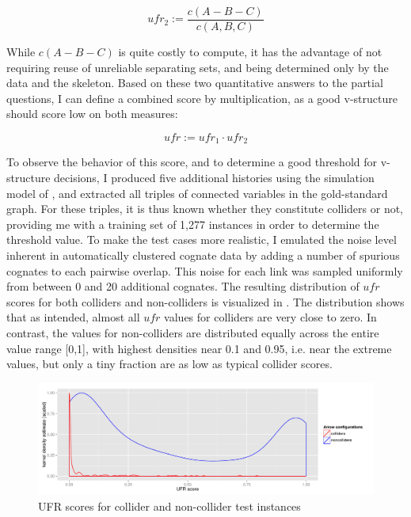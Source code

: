 \begin{equation}
 ufr_2 := \frac{c(A-B-C)}{c(A,B,C)}
\end{equation}

While $c(A-B-C)$ is quite costly to compute, it has the advantage of not requiring reuse of unreliable separating sets, and being determined only by the data and the skeleton. Based on these two quantitative answers to the partial questions, I can define a combined score by multiplication, as a good v-structure should score low on both measures:

\begin{equation}
 ufr := ufr_1 \cdot ufr_2
\end{equation}
 
To observe the behavior of this \textit{} score, and to determine a good threshold for v-structure decisions, I produced five additional histories using the simulation model of , and extracted all triples of connected variables in the gold-standard graph. For these triples, it is thus known whether they constitute colliders or not, providing me with a training set of 1,277 instances in order to determine the threshold value. To make the test cases more realistic, I emulated the noise level inherent in automatically clustered cognate data by adding a number of spurious cognates to each pairwise overlap. This noise for each link was sampled uniformly from between 0 and 20 additional cognates. The resulting distribution of $ufr$ scores for both colliders and non-colliders is visualized in . The distribution shows that as intended, almost all $ufr$ values for colliders are very close to zero. In contrast, the values for non-colliders are distributed 
equally across the entire value range [0,1], with highest densities near 0.1 and 0.95, i.e. near the extreme values, but only a tiny fraction are as low as typical collider scores.

\begin{figure}
 \includegraphics[width=\textwidth]{figures/ufr-density.pdf}
 \caption{UFR scores for collider and non-collider test instances}
 \label{ufr-scores}
\end{figure}

